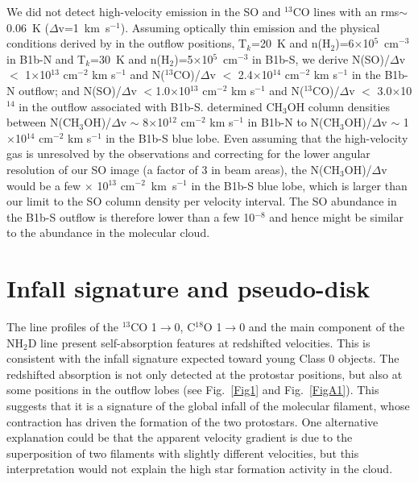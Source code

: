 \documentclass[letter]{aa}
\begin{document}
We did not detect high-velocity emission in the SO and $^{13}$CO lines 
with an rms$\sim$0.06~K ($\Delta$v=1~km~s$^{-1}$). 
Assuming optically thin emission and the physical conditions derived by \citet{Gerin15} 
in the outflow positions, T$_k$=20~K and n(H$_2$)=6$\times$10$^{5}$~cm$^{-3}$ in B1b-N and
T$_k$=30~K and n(H$_2$)=5$\times$10$^{5}$~cm$^{-3}$ in B1b-S, we derive
N(SO)/$\Delta$v $<$ 1$\times$10$^{13}$ cm$^{-2}$ km s$^{-1}$ and 
N($^{13}$CO)/$\Delta$v $<$ 2.4$\times$10$^{14}$ cm$^{-2}$ km s$^{-1}$
in the B1b-N outflow; and N(SO)/$\Delta$v $<$1.0$\times$10$^{13}$ cm$^{-2}$ km s$^{-1}$ 
and N($^{13}$CO)/$\Delta$v $<$ 3.0$\times$10$^{14}$ in the outflow associated with B1b-S.
\citet{Gerin15} determined CH$_3$OH column densities 
between N(CH$_3$OH)/$\Delta$v $\sim$ 8$\times$10$^{12}$ cm$^{-2}$ km s$^{-1}$ in B1b-N to
N(CH$_3$OH)/$\Delta$v $\sim$ 1$\times$10$^{14}$ cm$^{-2}$ km s$^{-1}$ in the B1b-S blue lobe.
Even assuming that the high-velocity gas is unresolved by the \citet{Gerin15} observations and 
correcting for the lower angular resolution of our SO image (a factor of 3 in beam areas), 
the N(CH$_3$OH)/$\Delta$v would be a few $\times$ 10$^{13}$ cm$^{-2}$~km~s$^{-1}$
in the B1b-S blue lobe, which is larger than our limit to the SO column density per velocity interval. 
The SO abundance in the B1b-S outflow is therefore lower 
than a few 10$^{-8}$ and hence might be similar to the abundance in the molecular cloud.


\section{Infall signature and pseudo-disk}
 
The line profiles of the $^{13}$CO 1$\rightarrow$0, C$^{18}$O 1$\rightarrow$0 and the main 
component of the NH$_2$D line present self-absorption features at redshifted velocities.
This is consistent with the infall signature expected toward young Class 0 objects.  
The redshifted absorption is not only detected at the protostar positions, but also at some
positions in the outflow lobes (see Fig.~\ref{Fig1} and Fig.~\ref{FigA1}). This suggests that it is a
signature of the global infall of the molecular filament, whose 
contraction has driven the formation of the two protostars. 
One alternative explanation could be that the apparent velocity
gradient is due to the superposition of two filaments with slightly different velocities,
but this interpretation would not explain the high star formation activity in the cloud.
 
\end{document}
